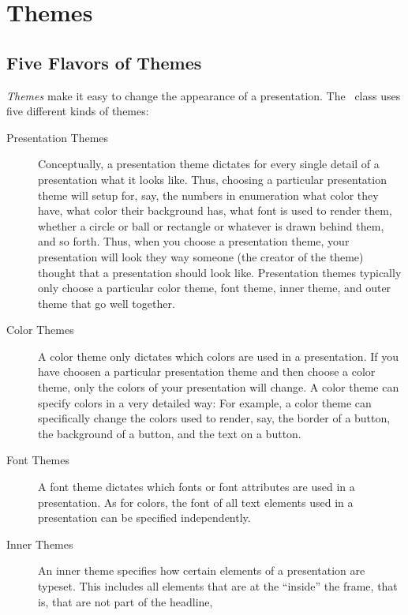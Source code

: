 
%


\section{Themes}


\subsection{Five Flavors of Themes}

\emph{Themes} make it easy to change the appearance of a
presentation. The \beamer\ class uses five different kinds of themes:
\begin{description}
\item[Presentation Themes]
  Conceptually, a presentation theme dictates for every single detail
  of a presentation what it looks like. Thus, choosing a particular
  presentation theme will setup for, say, the numbers in enumeration
  what color they have, what color their background has, what font is
  used to render them, whether a circle or ball or rectangle or
  whatever is drawn behind them, and so forth. Thus, when you choose
  a presentation theme, your presentation will look they way someone
  (the creator of the theme) thought that a presentation should look
  like. Presentation themes typically only choose a particular color
  theme, font theme, inner theme, and outer theme that go well
  together. 
\item[Color Themes]
  A color theme only dictates which colors are used in a
  presentation. If you have choosen a particular presentation theme
  and then choose a color theme, only the colors of your presentation
  will change. A color theme can specify colors in a very detailed
  way: For example, a color theme can specifically change the colors
  used to render, say, the border of a button, the background of a
  button, and the text on a button.
\item[Font Themes]
  A font theme dictates which fonts or font attributes are used in a
  presentation. As for colors, the font of all text elements used in a
  presentation can be specified independently.
\item[Inner Themes]
  An inner theme specifies how certain elements of a
  presentation are typeset. This includes all elements that are at the
  ``inside'' the frame, that is, that are not part of the headline,

\end{description}

